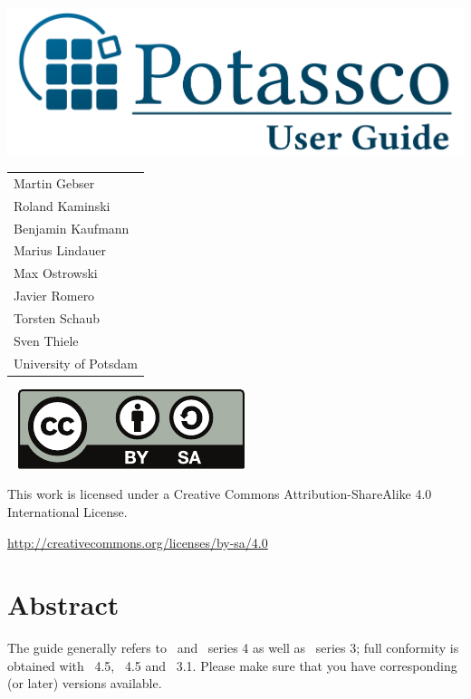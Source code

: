 \thispagestyle{empty}
\bigskip
\noindent
\includegraphics[width=\textwidth]{potassco_logo_blue}
\bigskip

\vfill

\hspace{5pt}
{\Large\color{potcolor}
\begin{tabular}{l}
Martin Gebser \\
Roland Kaminski \\
Benjamin Kaufmann \\
Marius Lindauer \\
Max Ostrowski \\
Javier Romero \\
Torsten Schaub \\
Sven Thiele \\[30pt]
University of Potsdam
\end{tabular}}

\newpage
\thispagestyle{empty}\ 
\vfill
\noindent
\includegraphics{by-sa}

\bigskip

\noindent
This work is licensed under a Creative Commons Attribution-ShareAlike 4.0\\ International License.

\medskip

\noindent
\url{http://creativecommons.org/licenses/by-sa/4.0}
\newpage
\thispagestyle{empty}\ 
\section*{Abstract}


\bigskip
\noindent
The guide generally refers to \gringo\ and \clingo\ series 4 as well as \clasp\ series 3;
full conformity is obtained with \gringo~4.5, \clingo~4.5 and \clasp~3.1.
Please make sure that you have corresponding (or later) versions available.

